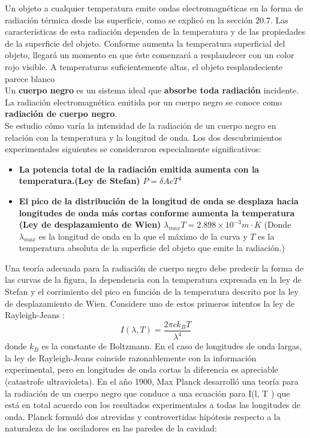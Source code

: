 \documentclass[10pt]{article}
\begin{document}
Un objeto a cualquier temperatura emite ondas electromagnéticas en la forma de radiación térmica desde las superficie, como se explicó en la sección 20.7. Las características de esta radiación dependen de la temperatura y de las propiedades de la superficie del objeto. Conforme aumenta la temperatura superficial del objeto, llegará un momento en que éste comenzará a resplandecer con un color rojo visible. A temperaturas suficientemente altas, el objeto resplandeciente parece blanco\\
\linebreak
Un \textbf{cuerpo negro} es un sistema ideal que \textbf{absorbe toda radiación} incidente. La radiación electromagnética emitida por un cuerpo negro se conoce como \textbf{radiación de cuerpo negro}.\\
\linebreak
Se estudio cómo varía la intensidad de la radiación de un cuerpo negro en relación con la temperatura y la longitud de onda. Los dos descubrimientos experimentales siguientes se consideraron especialmente significativos:
\begin{itemize}
	\item \textbf{La potencia total de la radiación emitida aumenta con la temperatura.(Ley de Stefan)} $P = \delta AeT^4$
	\item \textbf{El pico de la distribución de la longitud de onda se desplaza hacia longitudes de onda más cortas conforme aumenta la temperatura (Ley de desplazamiento de Wien)} $\lambda_{max} T = 2.898 \times 10^{-3} m\cdot K$ (Donde $\lambda_{max}$ es la longitud de onda en la que el máximo de la curva y $T$ es la temperatura absoluta de la superficie del objeto que emite la radiación.)
\end{itemize}

Una teoría adecuada para la radiación de cuerpo negro debe predecir la forma de las curvas de la figura, la dependencia con la temperatura expresada en la ley de Stefan y el corrimiento del pico en función de la temperatura descrito por la ley de desplazamiento de Wien. Considere uno de estos primeros intentos la ley de Rayleigh-Jeans :
\begin{equation*}
	I(\lambda, T) = \dfrac{2\pi ck_BT}{\lambda^4}
\end{equation*}
donde $k_B$  es la constante de Boltzmann. En el caso de longitudes de onda largas, la ley de Rayleigh-Jeans coincide razonablemente con la información experimental, pero en longitudes de onda cortas la diferencia es apreciable (catastrofe ultravioleta). En el año 1900, Max Planck desarrolló una teoría para la radiación de un cuerpo negro que conduce a una ecuación para I(l, T ) que está en total acuerdo con los resultados experimentales a todas las longitudes de onda. Planck formuló dos atrevidas y controvertidas hipótesis respecto a la naturaleza de los osciladores en las paredes de la cavidad:
\end{document}
